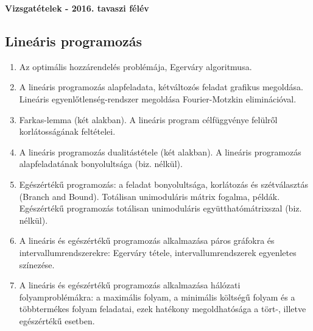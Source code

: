 
\footnotesize
\begin{center}
\large
\textbf{\Large Vizsgatételek - 2016. tavaszi félév}\\
\end{center}

\vspace{6mm}
\subsection*{Lineáris programozás}
\begin{enumerate}
\item	Az optimális hozzárendelés problémája, Egerváry algoritmusa.
\item	A lineáris programozás alapfeladata, kétváltozós feladat grafikus megoldása. Lineáris egyenlőtlenség-rendszer megoldása Fourier-Motzkin eliminációval.
\item	Farkas-lemma (két alakban). A lineáris program célfüggvénye felülről korlátosságának feltételei.
\item	A lineáris programozás dualitástétele (két alakban). A lineáris programozás alapfeladatának bonyolultsága (biz. nélkül).
\item	Egészértékű programozás: a feladat bonyolultsága, korlátozás és szétválasztás (Branch and Bound). Totálisan unimoduláris mátrix fogalma, példák. Egészértékű programozás totálisan unimoduláris együtthatómátrixszal (biz. nélkül).
\item	A lineáris és egészértékű programozás alkalmazása páros gráfokra és intervallumrendszerekre: Egerváry tétele, intervallumrendszerek egyenletes színezése.
\item	A lineáris és egészértékű programozás alkalmazása hálózati folyamproblémákra: a maximális folyam, a minimális költségű folyam és a többtermékes folyam feladatai, ezek hatékony megoldhatósága a tört-, illetve egészértékű esetben.
\end{enumerate}

\vspace{3mm}
